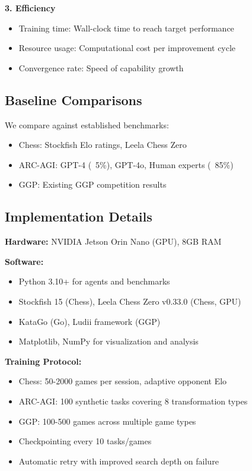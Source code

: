 \documentclass[11pt,letterpaper]{article}
\begin{document}
\textbf{3. Efficiency}
\begin{itemize}
\item Training time: Wall-clock time to reach target performance
\item Resource usage: Computational cost per improvement cycle
\item Convergence rate: Speed of capability growth
\end{itemize}

\subsection{Baseline Comparisons}

We compare against established benchmarks:

\begin{itemize}
\item Chess: Stockfish Elo ratings, Leela Chess Zero
\item ARC-AGI: GPT-4 (~5\%), GPT-4o, Human experts (~85\%)
\item GGP: Existing GGP competition results
\end{itemize}

\subsection{Implementation Details}

\textbf{Hardware:} NVIDIA Jetson Orin Nano (GPU), 8GB RAM

\textbf{Software:}
\begin{itemize}
\item Python 3.10+ for agents and benchmarks
\item Stockfish 15 (Chess), Leela Chess Zero v0.33.0 (Chess, GPU)
\item KataGo (Go), Ludii framework (GGP)
\item Matplotlib, NumPy for visualization and analysis
\end{itemize}

\textbf{Training Protocol:}
\begin{itemize}
\item Chess: 50-2000 games per session, adaptive opponent Elo
\item ARC-AGI: 100 synthetic tasks covering 8 transformation types
\item GGP: 100-500 games across multiple game types
\item Checkpointing every 10 tasks/games
\item Automatic retry with improved search depth on failure
\end{itemize}
\end{document}
